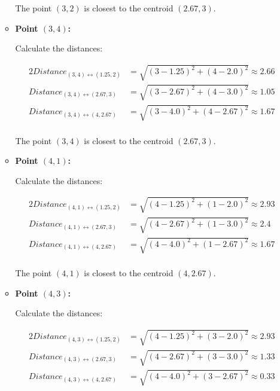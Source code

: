 \documentclass[
english,
smallborders
]{i6prcsht}
\begin{document}
\begin{solution}
\begin{enumerate}
\begin{itemize}
			            The point $(3,2)$ is closest to the centroid $(2.67,3)$.
			            
			      \item \textbf{Point $(3,4)$:}
			            
			            Calculate the distances:
			            
			            \begin{alignat*}{2}
				            Distance_{(3,4)\leftrightarrow(1.25,2)} & = \sqrt{(3-1.25)^2+(4-2.0)^2} \approx 2.66 \\
				            Distance_{(3,4)\leftrightarrow(2.67,3)} & = \sqrt{(3-2.67)^2+(4-3.0)^2} \approx 1.05 \\
				            Distance_{(3,4)\leftrightarrow(4,2.67)} & = \sqrt{(3-4.0)^2+(4-2.67)^2} \approx 1.67 \\
			            \end{alignat*}
			            
			            The point $(3,4)$ is closest to the centroid $(2.67,3)$.
			            
			      \item \textbf{Point $(4,1)$:}
			            
			            Calculate the distances:
			            
			            \begin{alignat*}{2}
				            Distance_{(4,1)\leftrightarrow(1.25,2)} & = \sqrt{(4-1.25)^2+(1-2.0)^2} \approx 2.93 \\
				            Distance_{(4,1)\leftrightarrow(2.67,3)} & = \sqrt{(4-2.67)^2+(1-3.0)^2} \approx 2.4  \\
				            Distance_{(4,1)\leftrightarrow(4,2.67)} & = \sqrt{(4-4.0)^2+(1-2.67)^2} \approx 1.67 \\
			            \end{alignat*}
			            
			            The point $(4,1)$ is closest to the centroid $(4,2.67)$.
			            
			      \item \textbf{Point $(4,3)$:}
			            
			            Calculate the distances:
			            
			            \begin{alignat*}{2}
				            Distance_{(4,3)\leftrightarrow(1.25,2)} & = \sqrt{(4-1.25)^2+(3-2.0)^2} \approx 2.93 \\
				            Distance_{(4,3)\leftrightarrow(2.67,3)} & = \sqrt{(4-2.67)^2+(3-3.0)^2} \approx 1.33 \\
				            Distance_{(4,3)\leftrightarrow(4,2.67)} & = \sqrt{(4-4.0)^2+(3-2.67)^2} \approx 0.33 \\
			            \end{alignat*}
			            

\end{itemize}
\end{enumerate}
\end{solution}
\end{document}
